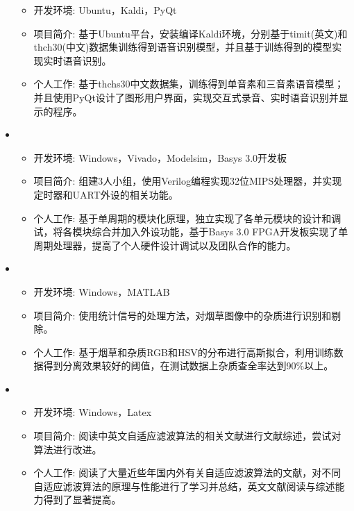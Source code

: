 \begin{itemize}[leftmargin=*]
{\begin{itemize}
      \item 开发环境: Ubuntu，Kaldi，PyQt
      \item 项目简介: 基于Ubuntu平台，安装编译Kaldi环境，分别基于timit(英文)和thch30(中文)数据集训练得到语音识别模型，并且基于训练得到的模型实现实时语音识别。
      \item 个人工作: 基于thchs30中文数据集，训练得到单音素和三音素语音模型；并且使用PyQt设计了图形用户界面，实现交互式录音、实时语音识别并显示的程序。
    \end{itemize}
    }
    \item {}
    {\small
    \begin{itemize}
      \item 开发环境: Windows，Vivado，Modelsim，Basys 3.0开发板
      \item 项目简介: 组建3人小组，使用Verilog编程实现32位MIPS处理器，并实现定时器和UART外设的相关功能。
      \item 个人工作: 基于单周期的模块化原理，独立实现了各单元模块的设计和调试，将各模块综合并加入外设功能，基于Basys 3.0 FPGA开发板实现了单周期处理器，提高了个人硬件设计调试以及团队合作的能力。
    \end{itemize}
    }
    \item
    {\small
    \begin{itemize}
      \item 开发环境: Windows，MATLAB
      \item 项目简介: 使用统计信号的处理方法，对烟草图像中的杂质进行识别和剔除。
      \item 个人工作: 基于烟草和杂质RGB和HSV的分布进行高斯拟合，利用训练数据得到分离效果较好的阈值，在测试数据上杂质查全率达到90\%以上。
    \end{itemize}
    }
    \item {}
    {\small
    \begin{itemize}
      \item 开发环境: Windows，Latex
      \item 项目简介: 阅读中英文自适应滤波算法的相关文献进行文献综述，尝试对算法进行改进。
      \item 个人工作: 阅读了大量近些年国内外有关自适应滤波算法的文献，对不同自适应滤波算法的原理与性能进行了学习并总结，英文文献阅读与综述能力得到了显著提高。
    \end{itemize}
    }

  \end{itemize}
